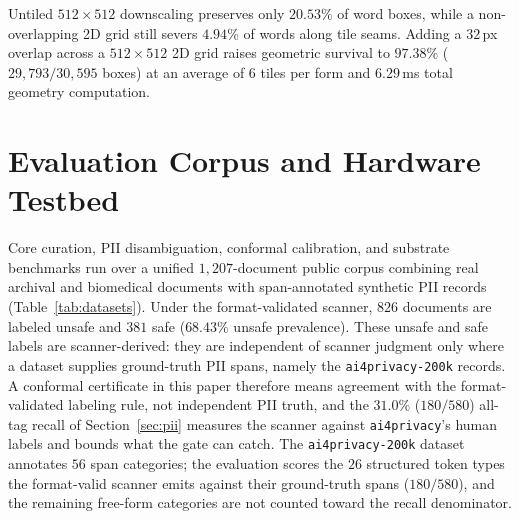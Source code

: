 \documentclass{article}
\begin{document}
\begin{table}[t]
\caption{Geometric word-box survival on $199$ ICDAR-2019 FUNSD forms ($30{,}595$ boxes; legibility threshold $\ge 8{\times}4$\,px).}
\label{tab:funsd}
\vskip 0.08in
\begin{center}
\end{center}
\vskip -0.14in
\end{table}

Untiled $512{\times}512$ downscaling preserves only $20.53\%$ of word boxes, while a non-overlapping 2D grid still severs $4.94\%$ of words along tile seams. Adding a $32$\,px overlap across a $512{\times}512$ 2D grid raises geometric survival to $97.38\%$ ($29{,}793 / 30{,}595$ boxes) at an average of $6$ tiles per form and $6.29$\,ms total geometry computation.

\section{Evaluation Corpus and Hardware Testbed}
\label{sec:datasets}

Core curation, PII disambiguation, conformal calibration, and substrate benchmarks run over a unified $1{,}207$-document public corpus combining real archival and biomedical documents with span-annotated synthetic PII records (Table~\ref{tab:datasets}). Under the format-validated scanner, $826$ documents are labeled unsafe and $381$ safe ($68.43\%$ unsafe prevalence). These unsafe and safe labels are scanner-derived: they are independent of scanner judgment only where a dataset supplies ground-truth PII spans, namely the \texttt{ai4privacy-200k} records. A conformal certificate in this paper therefore means agreement with the format-validated labeling rule, not independent PII truth, and the $31.0\%$ ($180/580$) all-tag recall of Section~\ref{sec:pii} measures the scanner against \texttt{ai4privacy}'s human labels and bounds what the gate can catch. The \texttt{ai4privacy-200k} dataset annotates $56$ span categories; the evaluation scores the $26$ structured token types the format-valid scanner emits against their ground-truth spans ($180/580$), and the remaining free-form categories are not counted toward the recall denominator.
\end{document}
